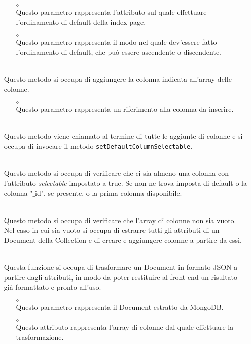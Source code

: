 \begin{itemize}
\begin{itemize}
\item[$\circ$]  \\ Questo parametro rappresenta l'attributo sul quale effettuare l'ordinamento di default della index-page.
\item[$\circ$]  \\ Questo parametro rappresenta il modo nel quale dev'essere fatto l'ordinamento di default, che può essere ascendente o discendente.
\end{itemize}
\item[]  \\ Questo metodo si occupa di aggiungere la colonna indicata all'array delle colonne.
\begin{itemize}\addtolength{\itemsep}{-0.5\baselineskip}
\item[$\circ$]  \\ Questo parametro rappresenta un riferimento alla colonna da inserire.
\end{itemize}
\item[]  \\ Questo metodo viene chiamato al termine di tutte le aggiunte di colonne e si occupa di invocare il metodo \texttt{setDefaultColumnSelectable}.
\item[]  \\ Questo metodo si occupa di verificare che ci sia almeno una colonna con l'attributo \textit{selectable} impostato a true. Se non ne trova imposta di default o la colonna "$\_$id", se presente, o la prima colonna disponibile.
\item[]  \\ Questo metodo si occupa di verificare che l'array di colonne non sia vuoto. Nel caso in cui sia vuoto si occupa di estrarre tutti gli attributi di un Document della Collection e di creare e aggiungere colonne a partire da essi.
\item[]  \\ Questa funzione si occupa di trasformare un Document in formato JSON a partire dagli attributi, in modo da poter restituire al front-end un risultato già formattato e pronto all'uso.
\begin{itemize}\addtolength{\itemsep}{-0.5\baselineskip}
\item[$\circ$]  \\ Questo parametro rappresenta il Document estratto da MongoDB.
\item[$\circ$]  \\ Questo attributo rappresenta l'array di colonne dal quale effettuare la trasformazione.
\end{itemize}
\end{itemize}


